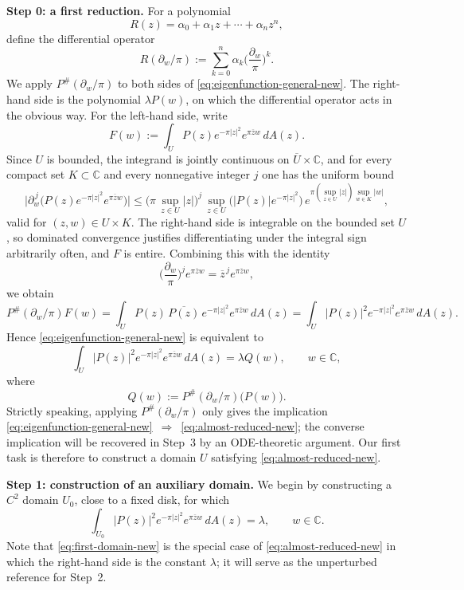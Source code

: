 \documentclass[a4paper,11pt,reqno]{amsart}
\numberwithin{equation}{section}
\theoremstyle{plain} %
\theoremstyle{definition} %
\theoremstyle{remark}
\newcommand{\C}{\mathbb{C}}
\begin{document}
\medskip
\noindent\textbf{Step 0: a first reduction.}
For a polynomial
\[
R(z)=\alpha_0+\alpha_1 z+\cdots+\alpha_n z^n,
\]
define the differential operator
\[
R(\partial_w/\pi):=\sum_{k=0}^n \alpha_k\Big(\frac{\partial_w}{\pi}\Big)^k.
\]
We apply $P^\#(\partial_w/\pi)$ to both sides of \eqref{eq:eigenfunction-general-new}. The right-hand side is the polynomial $\lambda P(w)$, on which the differential operator acts in the obvious way. For the left-hand side, write
\[
F(w):=\int_U P(z)e^{-\pi|z|^2}e^{\pi \overline z w}\,dA(z).
\]
Since $U$ is bounded, the integrand is jointly continuous on $\overline U\times \C$, and for every compact set $K\subset\C$ and every nonnegative integer $j$ one has the uniform bound
\[
\big|\partial_w^{\,j}\big(P(z)e^{-\pi|z|^2}e^{\pi\overline z w}\big)\big|
\le
\big(\pi\,\sup_{z\in U}|z|\big)^{j}\,\sup_{z\in U}\!\big(|P(z)|e^{-\pi|z|^2}\big)\,e^{\pi(\sup_{z\in U}|z|)\sup_{w\in K}|w|},
\]
valid for $(z,w)\in U\times K$. The right-hand side is integrable on the bounded set $U$, so dominated convergence justifies differentiating under the integral sign arbitrarily often, and $F$ is entire. Combining this with the identity
\[
\Big(\frac{\partial_w}{\pi}\Big)^j e^{\pi \overline z w}=\overline z^{\,j} e^{\pi \overline z w},
\]
we obtain
\[
P^\#(\partial_w/\pi)F(w)
=
\int_U P(z)\,\overline{P(z)}\,e^{-\pi|z|^2}e^{\pi\overline z w}\,dA(z)
=
\int_U |P(z)|^2 e^{-\pi|z|^2}e^{\pi\overline z w}\,dA(z).
\]
Hence \eqref{eq:eigenfunction-general-new} is equivalent to
\begin{equation}\label{eq:almost-reduced-new}
\int_U |P(z)|^2 e^{-\pi|z|^2} e^{\pi \overline z w}\,dA(z)=\lambda Q(w),
\qquad w\in\C,
\end{equation}
where
\[
Q(w):=P^\#(\partial_w/\pi)\big(P(w)\big).
\]
Strictly speaking, applying $P^\#(\partial_w/\pi)$ only gives the implication \eqref{eq:eigenfunction-general-new}~$\Rightarrow$~\eqref{eq:almost-reduced-new}; the converse implication will be recovered in Step~3 by an ODE-theoretic argument. Our first task is therefore to construct a domain $U$ satisfying \eqref{eq:almost-reduced-new}.

\medskip
\noindent\textbf{Step 1: construction of an auxiliary domain.}
We begin by constructing a $C^2$ domain $U_0$, close to a fixed disk, for which
\begin{equation}\label{eq:first-domain-new}
\int_{U_0} |P(z)|^2 e^{-\pi|z|^2} e^{\pi \overline z w}\,dA(z)=\lambda,
\qquad w\in\C.
\end{equation}
Note that \eqref{eq:first-domain-new} is the special case of \eqref{eq:almost-reduced-new} in which the right-hand side is the constant $\lambda$; it will serve as the unperturbed reference for Step~2.
\end{document}
